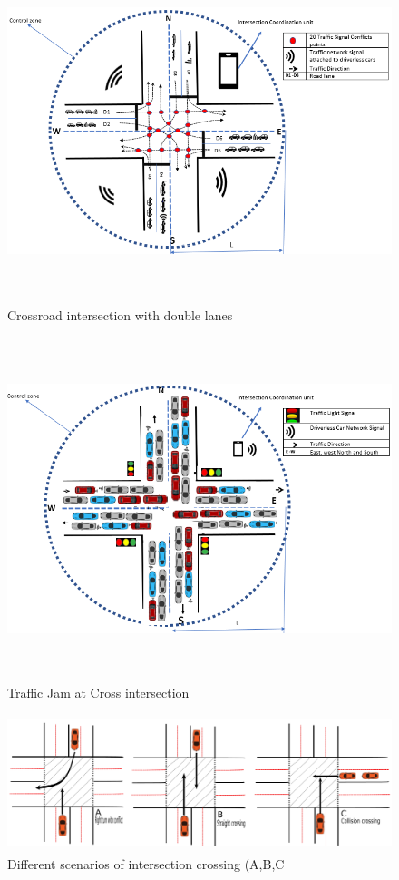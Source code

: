 \documentclass{book}
\begin{document}
\begin{figure}
\centering
\includegraphics[width=15cm,height=10cm]{crossjunction1}
\caption{Crossroad intersection with double lanes}
\label{fig:Crossjunction}
\end{figure}



\begin{figure}
\includegraphics[width=12cm,height=10cm]{intersectioncrash}
\caption{Traffic Jam at Cross intersection}
\label{fig:intersectioncrash}
\end{figure}

\begin{figure}
\includegraphics[width=14cm,height=4cm]{diffcrossingscinerios.PNG}
\caption{Different scenarios of intersection crossing (A,B,C}
\label{figIntersection scenerios}
\end{figure}
\end{document}
